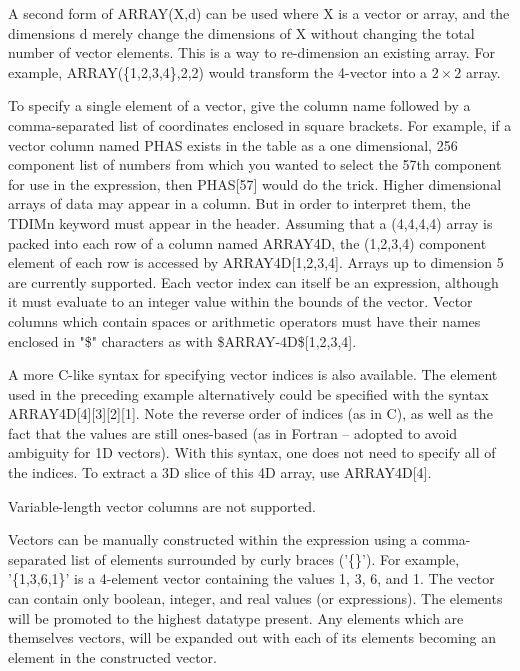 \documentclass[11pt]{book}
\begin{document}
    A second form of ARRAY(X,d) can be used where X is a vector or
    array, and the dimensions d merely change the dimensions of X
    without changing the total number of vector elements.  This is a
    way to re-dimension an existing array.  For example,
    ARRAY(\{1,2,3,4\},{2,2}) would transform the 4-vector into a
    $2\times 2$ array.

    To  specify  a  single  element  of  a  vector, give the column name
    followed by  a  comma-separated  list  of  coordinates  enclosed  in
    square  brackets.  For example, if a vector column named PHAS exists
    in the table as a one dimensional, 256  component  list  of  numbers
    from  which  you  wanted to select the 57th component for use in the
    expression, then PHAS[57] would do the  trick.   Higher  dimensional
    arrays  of  data  may appear in a column.  But in order to interpret
    them, the TDIMn keyword must appear in the header.  Assuming that  a
    (4,4,4,4)  array  is packed into each row of a column named ARRAY4D,
    the  (1,2,3,4)  component  element  of  each  row  is  accessed   by
    ARRAY4D[1,2,3,4].    Arrays   up   to   dimension  5  are  currently
    supported.  Each vector index can itself be an expression,  although
    it  must  evaluate  to  an  integer  value  within the bounds of the
    vector.  Vector columns which contain spaces or arithmetic operators
    must   have   their   names  enclosed  in  "\$"  characters  as  with
    \$ARRAY-4D\$[1,2,3,4].

    A  more  C-like  syntax  for  specifying  vector  indices  is   also
    available.   The element used in the preceding example alternatively
    could be specified with the syntax  ARRAY4D[4][3][2][1].   Note  the
    reverse  order  of  indices  (as in C), as well as the fact that the
    values are still ones-based (as  in  Fortran  --  adopted  to  avoid
    ambiguity  for  1D vectors).  With this syntax, one does not need to
    specify all of the indices.  To  extract  a  3D  slice  of  this  4D
    array, use ARRAY4D[4].

    Variable-length vector columns are not supported.

    Vectors can  be manually constructed  within the expression  using a
    comma-separated list of  elements surrounded by curly braces ('\{\}').
    For example, '\{1,3,6,1\}' is a 4-element vector containing the values
    1, 3, 6, and 1.  The  vector can contain  only boolean, integer, and
    real values (or expressions).  The elements will  be promoted to the
    highest  datatype   present.  Any   elements   which  are themselves
    vectors, will be expanded out with  each of its elements becoming an
    element in the constructed vector.
\end{document}
